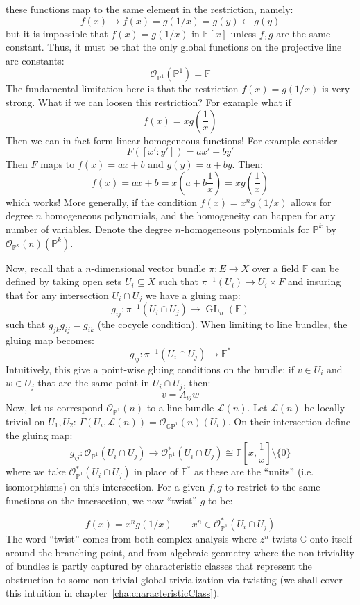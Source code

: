 \documentclass{book}
\newcommand{\F}{{\mathbb{F}}}
\newcommand{\C}{{\mathbb{C}}}
\renewcommand{\P}{{\mathbb{P}}}
\newcommand{\CL}{{\mathcal{L}}}
\newcommand{\CO}{{\mathcal{O}}}
\newcommand{\CP}{{\mathbb{C}\mathrm{P}}}
\newcommand{\sse}{\subseteq}
\newcommand{\GL}{{\operatorname{GL}}}
\begin{document}
these functions map to the same element in the restriction, namely:
\[
  f(x) \to f(x) = g(1/x) = g(y) \leftarrow g(y)
\]
but it is impossible that $f(x) = g(1/x)$ in $\F[x]$ unless $f,g$ are the same constant. Thus, it must be that the only
global functions on the projective line are constants:
\[
  \CO_{\P^1}(\P^1) = \F
\]
The fundamental limitation here is that the restriction $f(x) = g(1/x)$ is very strong. What if we can loosen
this restriction? For example what if
\[
  f(x) = xg\left(\frac{1}{x}\right)
\]
Then we can in fact form linear homogeneous functions! For example consider
\[
  F([x':y']) = ax'+by'
\]
Then $F$ maps to $f(x) = ax+b$ and $g(y) = a + by$. Then:
\[
  f(x)= ax+b = x\left(a + b \frac{1}{x}\right)  = xg\left(\frac{1}{x}\right)
\]
which works! More generally, if the condition $f(x) = x^ng(1/x)$ allows for degree $n$ homogeneous
polynomials, and the homogeneity can happen for any number of variables. Denote the degree $n$-homogeneous
polynomials for $\P^k$ by $\CO_{\P^k}(n)(\P^k)$.

Now, recall that a $n$-dimensional vector bundle $\pi: E \to X$ over a field $\F$ can be defined by taking open
sets $U_i \sse X$ such that $\pi^{-1}(U_i) \to U_i\times F$ and insuring that for any intersection $U_i\cap
U_j$ we have a gluing map:
\[
  g_{ij}: \pi^{-1}(U_i\cap U_j) \to \GL_n(\F)
\]
such that $g_{jk}g_{ij} = g_{ik}$ (the cocycle condition). When limiting
to line bundles, the gluing map becomes:
\[
  g_{ij}: \pi^{-1}(U_i\cap U_j) \to \F^*
\]
Intuitively, this give a point-wise gluing conditions on the bundle: if $v \in U_i$ and $w \in U_j$ that are
the same point in $U_i\cap U_j$, then:
\[
  v = A_{ij}w
\]
Now, let us correspond $\CO_{\P^1}(n)$ to a line bundle $\CL(n)$. Let $\CL(n)$ be
locally trivial on $U_1, U_2$: $\Gamma(U_i, \CL(n)) = \CO_{\CP^1}(n)(U_i)$. On their intersection define the gluing
map: \[ g_{ij}: \CO_{\P^1}(U_i\cap U_j) \to \CO_{\P^1}^*(U_i\cap U_j) \cong \F\left[x,
\frac{1}{x}\right]\setminus\{0\} \] where we take $\CO_{\P^1}^*(U_i\cap U_j)$ in place of $\F^*$ as these are
the ``units'' (i.e. isomorphisms) on this intersection. For a given $f,g$ to restrict to the same functions on
the intersection, we now ``twist'' $g$ to be:

\[
  f(x) = x^ng(1/x) \qquad x^n \in \CO_{\P^1}^*(U_i\cap U_j)
\]
The word ``twist'' comes from both complex analysis where $z^n$ twists $\C$ onto itself around the branching
point, and from algebraic geometry where the non-triviality of bundles is partly captured by characteristic
classes that represent the obstruction to some non-trivial global trivialization via twisting (we shall cover
this intuition in chapter~\ref{cha:characteristicClass}).
\end{document}
